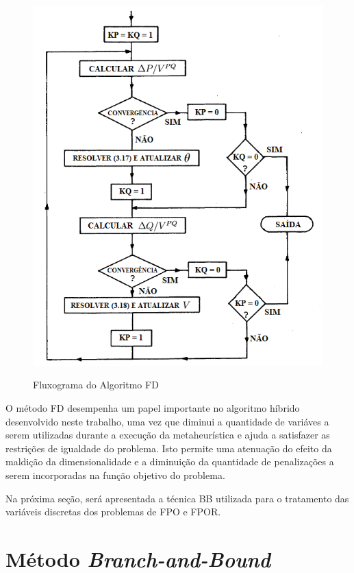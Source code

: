 \documentclass[
	12pt,				%
	openany,			%
	twoside,			%
	a4paper,			%
	chapter=TITLE,		%
	section=Title,		%
	subsection=Title,	%
	subsubsection=Title,%
	english,			%
	french,				%
	spanish,			%
	brazil			%
	]{abntex2}
\begin{document}
\begin{ERRATA}
\begin{figure}[!h]
\centering
\caption{Fluxograma do Algoritmo FD}
\includegraphics{images/fluxograma_fd.png}
\label{fdflux}
\end{figure}

O método FD desempenha um papel importante no algoritmo híbrido desenvolvido neste trabalho, uma vez que diminui a quantidade de variáves a serem utilizadas durante a execução da metaheurística e ajuda a satisfazer as restrições de igualdade do problema. Isto permite uma atenuação do efeito da maldição da dimensionalidade e a diminuição da quantidade de penalizações a serem incorporadas na função objetivo do problema.

Na próxima seção, será apresentada a técnica BB utilizada para o tratamento das variáveis discretas dos problemas de FPO e FPOR.


\section{Método \emph{Branch-and-Bound}}


\end{ERRATA}
\end{document}
